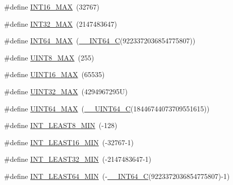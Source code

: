 \begin{DoxyCompactItemize}
\item 
\#define \hyperlink{win_2_l_a_d_s_p_a__plugins-win_2glibc__includes_2stdint_8h_ac58f2c111cc9989c86db2a7dc4fd84ca}{I\+N\+T16\+\_\+\+M\+AX}~(32767)
\item 
\#define \hyperlink{win_2_l_a_d_s_p_a__plugins-win_2glibc__includes_2stdint_8h_a181807730d4a375f848ba139813ce04f}{I\+N\+T32\+\_\+\+M\+AX}~(2147483647)
\item 
\#define \hyperlink{win_2_l_a_d_s_p_a__plugins-win_2glibc__includes_2stdint_8h_ad0d744f05898e32d01f73f8af3cd2071}{I\+N\+T64\+\_\+\+M\+AX}~(\hyperlink{win_2_l_a_d_s_p_a__plugins-win_2glibc__includes_2stdint_8h_a4b8971e411b88166747d2a3c2425eaee}{\+\_\+\+\_\+\+I\+N\+T64\+\_\+C}(9223372036854775807))
\item 
\#define \hyperlink{win_2_l_a_d_s_p_a__plugins-win_2glibc__includes_2stdint_8h_aeb4e270a084ee26fe73e799861bd0252}{U\+I\+N\+T8\+\_\+\+M\+AX}~(255)
\item 
\#define \hyperlink{win_2_l_a_d_s_p_a__plugins-win_2glibc__includes_2stdint_8h_a3ea490c9b3617d4479bd80ef93cd5602}{U\+I\+N\+T16\+\_\+\+M\+AX}~(65535)
\item 
\#define \hyperlink{win_2_l_a_d_s_p_a__plugins-win_2glibc__includes_2stdint_8h_ab5eb23180f7cc12b7d6c04a8ec067fdd}{U\+I\+N\+T32\+\_\+\+M\+AX}~(4294967295\+U)
\item 
\#define \hyperlink{win_2_l_a_d_s_p_a__plugins-win_2glibc__includes_2stdint_8h_a30654b4b67d97c42ca3f9b6052dda916}{U\+I\+N\+T64\+\_\+\+M\+AX}~(\hyperlink{win_2_l_a_d_s_p_a__plugins-win_2glibc__includes_2stdint_8h_a405cee4934ed56c9a4aa4e7dc4380bd2}{\+\_\+\+\_\+\+U\+I\+N\+T64\+\_\+C}(18446744073709551615))
\item 
\#define \hyperlink{win_2_l_a_d_s_p_a__plugins-win_2glibc__includes_2stdint_8h_a3e986cad833f63f420962ff60eda87e5}{I\+N\+T\+\_\+\+L\+E\+A\+S\+T8\+\_\+\+M\+IN}~(-\/128)
\item 
\#define \hyperlink{win_2_l_a_d_s_p_a__plugins-win_2glibc__includes_2stdint_8h_a1f91bfd5820c2f27af3d260fc75813e1}{I\+N\+T\+\_\+\+L\+E\+A\+S\+T16\+\_\+\+M\+IN}~(-\/32767-\/1)
\item 
\#define \hyperlink{win_2_l_a_d_s_p_a__plugins-win_2glibc__includes_2stdint_8h_a2360a536116dd734820a6b5b3d560ce7}{I\+N\+T\+\_\+\+L\+E\+A\+S\+T32\+\_\+\+M\+IN}~(-\/2147483647-\/1)
\item 
\#define \hyperlink{win_2_l_a_d_s_p_a__plugins-win_2glibc__includes_2stdint_8h_ac12b4f6966b57ad82feb683b284b4060}{I\+N\+T\+\_\+\+L\+E\+A\+S\+T64\+\_\+\+M\+IN}~(-\/\hyperlink{win_2_l_a_d_s_p_a__plugins-win_2glibc__includes_2stdint_8h_a4b8971e411b88166747d2a3c2425eaee}{\+\_\+\+\_\+\+I\+N\+T64\+\_\+C}(9223372036854775807)-\/1)

\end{DoxyCompactItemize}
